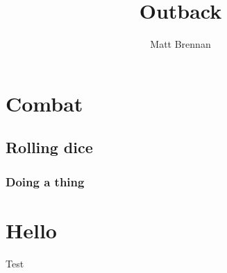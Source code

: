 \documentclass[10pt, a4paper, twocolumn]{book}
\title{Outback}
\author{Matt Brennan}
\date{}
\begin{document}
{\let\cleardoublepage\clearpage
\maketitle
\tableofcontents
}

\chapter{Combat}
\lipsum[1]

\section{Rolling dice}
\lipsum[1]
\subsection{Doing a thing}
\lipsum

\chapter{Hello}
Test
\end{document}
